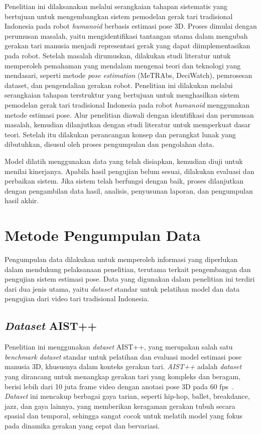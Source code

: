 Penelitian ini dilaksanakan melalui serangkaian tahapan sistematis yang bertujuan untuk mengembangkan sistem pemodelan gerak tari tradisional Indonesia pada robot \textit{humanoid} berbasis estimasi pose 3D. Proses dimulai dengan perumusan masalah, yaitu mengidentifikasi tantangan utama dalam mengubah gerakan tari manusia menjadi representasi gerak yang dapat diimplementasikan pada robot. Setelah masalah dirumuskan, dilakukan studi literatur untuk memperoleh pemahaman yang mendalam mengenai teori dan teknologi yang mendasari, seperti metode \textit{pose estimation} (MeTRAbs, DeciWatch), pemrosesan dataset, dan pengendalian gerakan robot.
Penelitian ini dilakukan melalui serangkaian tahapan terstruktur yang bertujuan untuk menghasilkan sistem pemodelan gerak tari tradisional Indonesia pada robot \textit{humanoid} menggunakan metode estimasi pose. Alur penelitian diawali dengan identifikasi dan perumusan masalah, kemudian dilanjutkan dengan studi literatur untuk memperkuat dasar teori. Setelah itu dilakukan perancangan konsep dan perangkat lunak yang dibutuhkan, disusul oleh proses pengumpulan dan pengolahan data. 

Model dilatih menggunakan data yang telah disiapkan, kemudian diuji untuk menilai kinerjanya. Apabila hasil pengujian belum sesuai, dilakukan evaluasi dan perbaikan sistem. Jika sistem telah berfungsi dengan baik, proses dilanjutkan dengan pengambilan data hasil, analisis, penyusunan laporan, dan pengumpulan hasil akhir. 

\section{Metode Pengumpulan Data}

Pengumpulan data dilakukan untuk memperoleh informasi yang diperlukan dalam mendukung pelaksanaan penelitian, terutama terkait pengembangan dan pengujian sistem estimasi pose. Data yang digunakan dalam penelitian ini terdiri dari dua jenis utama, yaitu \textit{dataset} standar untuk pelatihan model dan data pengujian dari video tari tradisional Indonesia.

\subsection{\textit{Dataset} AIST++}

Penelitian ini menggunakan \textit{dataset} AIST++, yang merupakan salah satu \textit{benchmark dataset} standar untuk pelatihan dan evaluasi model estimasi pose manusia 3D, khususnya dalam konteks gerakan tari. \textit{AIST++} adalah \textit{dataset} yang dirancang untuk menangkap gerakan tari yang kompleks dan beragam, berisi lebih dari 10 juta frame video dengan anotasi pose 3D pada 60 fps~. \textit{Dataset} ini mencakup berbagai gaya tarian, seperti hip-hop, ballet, breakdance, jazz, dan gaya lainnya, yang memberikan keragaman gerakan tubuh secara spasial dan temporal, sehingga sangat cocok untuk melatih model yang fokus pada dinamika gerakan yang cepat dan bervariasi.

